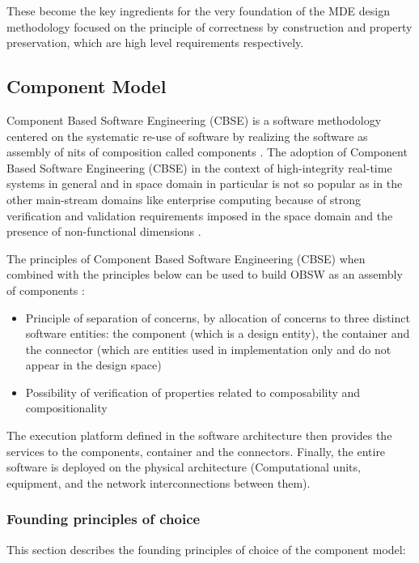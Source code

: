 These become the key ingredients for the very foundation of the MDE design methodology focused on the principle of correctness by construction and property preservation, which are high level requirements respectively.

\subsection{Component Model}
Component Based Software Engineering (CBSE) is a software methodology centered on the systematic re-use of software by realizing the software as assembly of nits of composition called components \cite{CBSE}.
The adoption of Component Based Software Engineering (CBSE) in the context of high-integrity real-time systems in general and in space domain in particular is not so popular as in the other main-stream domains like enterprise computing \cite{SAVOIR} because of strong verification and validation requirements imposed in the space domain and the presence of non-functional dimensions \cite{SAVOIR}.

The principles of Component Based Software Engineering (CBSE) when combined with the principles below can be used to build OBSW as an assembly of components \cite{SAVOIR}: 
\begin{itemize}
\item Principle of separation of concerns, by allocation of concerns to three distinct software entities: the component (which is a design entity), the container and the connector (which are entities used in implementation only and do not appear in the design space)
\item Possibility of verification of properties related to composability and compositionality \cite{CompBasedDev} 
\end{itemize}

The execution platform defined in the software architecture then provides the services to the components, container and the connectors. Finally, the entire software is deployed on the physical architecture (Computational units, equipment, and the network interconnections between them).

\subsubsection{\textbf{Founding principles of choice}}
This section describes the founding principles of choice of the component model:

